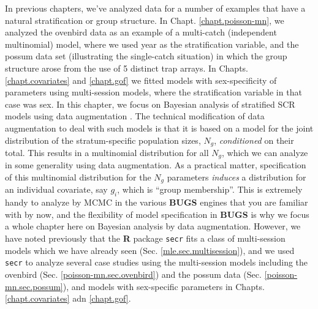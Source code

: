 In previous chapters, we've analyzed data for a number of examples
that have a natural stratification or group structure. In
Chapt. \ref{chapt.poisson-mn}, we analyzed the ovenbird data as an
example of a multi-catch (independent multinomial) model, where we
used year as the stratification variable, and the possum data set
(illustrating the single-catch situation) in which the group structure
arose from the use of 5 distinct trap arrays.  In
Chapts. \ref{chapt.covariates} and \ref{chapt.gof} we fitted models
with sex-specificity of parameters using multi-session models, where
the stratification variable in that case was sex.  In this chapter, we
focus on Bayesian analysis of stratified SCR models using data
augmentation \citep{converse_royle:2012,royle_etal:2012arXiv}.  The
technical modification of data augmentation to deal with such models
is that it is based on a model for the joint distribution of the
stratum-specific population sizes, $N_{g}$, {\it conditioned} on their
total. This results in a multinomial distribution for all $N_{g}$,
which we can analyze in some generality using data augmentation.  As a
practical matter, specification of this multinomial distribution for
the $N_{g}$ parameters {\it induces} a distribution for an individual
covariate, say $g_{i}$, which is ``group membership''.  This is
extremely handy to analyze by MCMC in the various {\bf BUGS} engines
that you are familiar with by now, and the flexibility of model
specification in {\bf BUGS} is why we focus a whole chapter here on
Bayesian analysis by data augmentation.  However, we have noted
previously that the {\bf R} package \mbox{\tt secr} fits a class of
multi-session models which we have already seen
(Sec. \ref{mle.sec.multisession}), and we used \mbox{\tt secr} to
analyze several case studies using the multi-session models including
the ovenbird (Sec. \ref{poisson-mn.sec.ovenbird}) and the possum data
(Sec. \ref{poisson-mn.sec.possum}), and models with sex-specific
parameters in Chapts. \ref{chapt.covariates} adn \ref{chapt.gof}.

